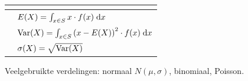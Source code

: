 \begin{frame}
{\begin{center}
\begin{tabular}{m{}m{}}
{\begin{itemize}
                        \end{itemize}} \\ \midrule
                        \uncover<+->{$E(X) = \sum_{x \in S} x \cdot f(x)$ & $E(X) = \int_{x \in S} x \cdot f(x) \;\mathrm{d}x$} \\ \midrule
                        \uncover<+->{$\Var{X} = \sum_{x \in S} \left(x - E(X)\right)^2 \cdot f(x)$ & $\text{Var}(X) = \int_{x \in S} \left(x - E(X)\right)^2 \cdot f(x) \;\mathrm{d}x$} \\ \midrule
                        \uncover<+->{$\sigma(X) = \sqrt{\Var{X}}$ & $\sigma(X) = \sqrt{\Var{X}}$} \\                 
                    \bottomrule
                \end{tabular}   
            \end{center}
        }
        \vfill\pause
        Veelgebruikte verdelingen: normaal $N(\mu, \sigma)$, binomiaal, Poisson.
    \end{frame}

